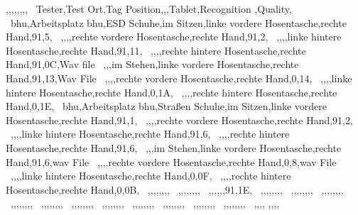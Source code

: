 ,,,,,,,,	\
Tester,Test Ort,Tag Position,,,Tablet,Recognition ,Quality,	\
bhu,Arbeitsplatz bhu,ESD Schuhe,im Sitzen,linke vordere Hosentasche,rechte Hand,91,5,	\
,,,,rechte vordere Hosentasche,rechte Hand,91,2,	\
,,,,linke hintere Hosentasche,rechte Hand,91,11,	\
,,,,rechte hintere Hosentasche,rechte Hand,91,0C,Wav file	\
,,,im Stehen,linke vordere Hosentasche,rechte Hand,91,13,Wav File	\
,,,,rechte vordere Hosentasche,rechte Hand,0,14,	\
,,,,linke hintere Hosentasche,rechte Hand,0,1A,	\
,,,,rechte hintere Hosentasche,rechte Hand,0,1E,	\
bhu,Arbeitsplatz bhu,Straßen Schuhe,im Sitzen,linke vordere Hosentasche,rechte Hand,91,1,	\
,,,,rechte vordere Hosentasche,rechte Hand,91,2,	\
,,,,linke hintere Hosentasche,rechte Hand,91,6,	\
,,,,rechte hintere Hosentasche,rechte Hand,91,6,	\
,,,im Stehen,linke vordere Hosentasche,rechte Hand,91,6,wav File	\
,,,,rechte vordere Hosentasche,rechte Hand,0,8,wav File	\
,,,,linke hintere Hosentasche,rechte Hand,0,0F,	\
,,,,rechte hintere Hosentasche,rechte Hand,0,0B,	\
,,,,,,,,	\
,,,,,,,,	\
,,,,,,91,1E,	\
,,,,,,,,	\
,,,,,,,,	\
,,,,,,,,	\
,,,,,,,,	\
,,,,,,,,	\
,,,,,,,,	\
,,,,,,,,	\
,,,,,,,,	\
,,,,,,,,	\
,,,,,,,,	\
,,,,,,,,	\
,,,, ,,,,	\
